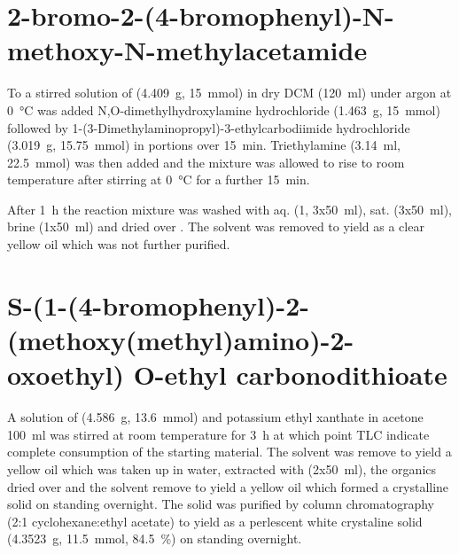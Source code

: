 
\section{2-bromo-2-(4-bromophenyl)-N-methoxy-N-methylacetamide}
To a stirred solution of  (\SI{4.409}{\gram}, \SI{15}{\milli\mol}) in dry DCM (\SI{120}{\milli\litre}) under argon at \SI{0}{\celsius} was added N,O-dimethylhydroxylamine hydrochloride (\SI{1.463}{\gram}, \SI{15}{\milli\mol}) followed by 1-(3-Dimethylaminopropyl)-3-ethylcarbodiimide hydrochloride (\SI{3.019}{\gram}, \SI{15.75}{\milli\mol}) in portions over \SI{15}{\minute}. Triethylamine (\SI{3.14}{\milli\litre}, \SI{22.5}{\milli\mol}) was then added and the mixture was allowed to rise to room temperature after stirring at \SI{0}{\celsius} for a further \SI{15}{\minute}.

After \SI{1}{\hour} the reaction mixture was washed with aq.  (\SI{1}{\Molar}, 3x\SI{50}{\milli\litre}), sat.  (3x\SI{50}{\milli\litre}), brine (1x\SI{50}{\milli\litre}) and dried over . The solvent was removed \invacuo to yield  as a clear yellow oil which was not further purified.


\section{S-(1-(4-bromophenyl)-2-(methoxy(methyl)amino)-2-oxoethyl) O-ethyl carbonodithioate}

A solution of  (\SI{4.586}{\gram}, \SI{13.6}{\milli\mol}) and potassium ethyl xanthate in acetone {\SI{100}{\milli\litre}} was  stirred at room temperature for \SI{3}{\hour} at which point TLC indicate complete consumption of the starting material. The solvent was remove \invacuo to yield a yellow oil which was taken up in water, extracted with  (2x\SI{50}{\milli\litre}), the organics dried over  and the solvent remove to yield a yellow oil which formed a crystalline solid on standing overnight. The solid was purified by column chromatography (2:1 cyclohexane:ethyl acetate) to yield  as a perlescent white crystaline solid (\SI{4.3523}{\gram}, \SI{11.5}{\milli\mol}, \SI{84.5}{\percent}) on standing overnight.


